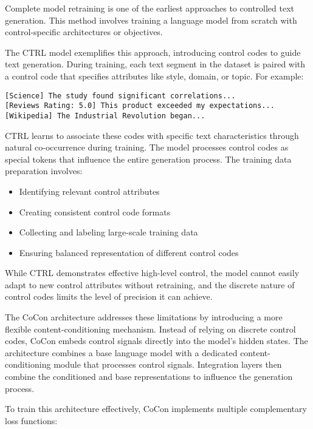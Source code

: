 Complete model retraining is one of the earliest approaches to controlled text generation.
This method involves training a language model from scratch with control-specific architectures or objectives.

The CTRL model \cite{keskar2019ctrlconditionaltransformerlanguage} exemplifies this approach, introducing control codes to guide text generation. During training, each text segment in the dataset is paired with a control code that specifies attributes like style, domain, or topic. For example:

\begin{verbatim}
[Science] The study found significant correlations...
[Reviews Rating: 5.0] This product exceeded my expectations...
[Wikipedia] The Industrial Revolution began...
\end{verbatim}

CTRL learns to associate these codes with specific text characteristics through natural co-occurrence during training. 
The model processes control codes as special tokens that influence the entire generation process. 
The training data preparation involves:

\begin{itemize}
   \item Identifying relevant control attributes
   \item Creating consistent control code formats
   \item Collecting and labeling large-scale training data
   \item Ensuring balanced representation of different control codes
\end{itemize}

While CTRL demonstrates effective high-level control, the model cannot easily adapt to new control attributes without retraining, and the discrete nature of control codes limits the level of precision it can achieve.

The CoCon architecture \cite{chan2022coconselfsupervisedapproachcontrolled} addresses these limitations by introducing a more flexible content-conditioning mechanism. 
Instead of relying on discrete control codes, CoCon embeds control signals directly into the model's hidden states. 
The architecture combines a base language model with a dedicated content-conditioning module that processes control signals. 
Integration layers then combine the conditioned and base representations to influence the generation process.

To train this architecture effectively, CoCon implements multiple complementary loss functions:

